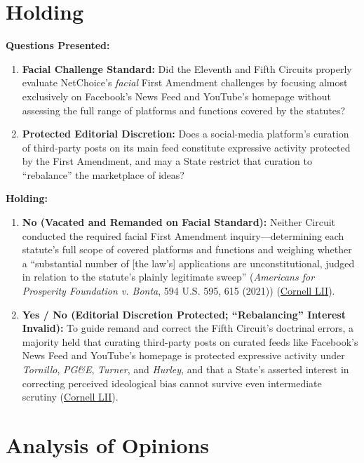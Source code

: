 \documentclass[12pt]{article}
\begin{document}
\section{Holding}
\textbf{Questions Presented:}

\begin{enumerate}
    \item \textbf{Facial Challenge Standard:} Did the Eleventh and Fifth Circuits properly evaluate NetChoice's \emph{facial} First Amendment challenges by focusing almost exclusively on Facebook's News Feed and YouTube's homepage without assessing the full range of platforms and functions covered by the statutes?
    \item \textbf{Protected Editorial Discretion:} Does a social-media platform's curation of third-party posts on its main feed constitute expressive activity protected by the First Amendment, and may a State restrict that curation to ``rebalance'' the marketplace of ideas?
\end{enumerate}

\textbf{Holding:}

\begin{enumerate}
    \item \textbf{No (Vacated and Remanded on Facial Standard):} Neither Circuit conducted the required facial First Amendment inquiry---determining each statute's full scope of covered platforms and functions and weighing whether a ``substantial number of [the law's] applications are unconstitutional, judged in relation to the statute's plainly legitimate sweep'' (\textit{Americans for Prosperity Foundation v. Bonta}, 594 U.S. 595, 615 (2021)) (\href{https://www.law.cornell.edu/supremecourt/text/22-277}{Cornell LII}).
    \item \textbf{Yes / No (Editorial Discretion Protected; ``Rebalancing'' Interest Invalid):} To guide remand and correct the Fifth Circuit's doctrinal errors, a majority held that curating third-party posts on curated feeds like Facebook's News Feed and YouTube's homepage is protected expressive activity under \textit{Tornillo}, \textit{PG\&E}, \textit{Turner}, and \textit{Hurley}, and that a State's asserted interest in correcting perceived ideological bias cannot survive even intermediate scrutiny (\href{https://www.law.cornell.edu/supremecourt/text/22-277}{Cornell LII}).
\end{enumerate}

\section{Analysis of Opinions}
\end{document}
